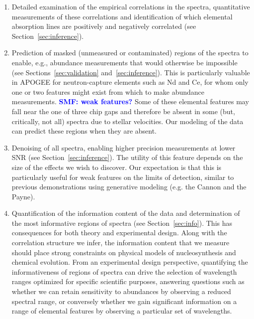 \documentclass[a4paper,fleqn,usenatbib]{mnras}
\newcommand{\smf}[1]{\textbf{\textcolor{blue}{SMF: #1}}}
\begin{document}
\begin{enumerate}
\item Detailed examination of the empirical correlations in the spectra, quantitative measurements of these correlations and identification of which elemental absorption lines are positively and negatively correlated (see Section~\ref{sec:inference}). %
\item Prediction of masked (unmeasured or contaminated) regions of the spectra to enable, e.g., abundance measurements that would otherwise be impossible (see Sections~\ref{sec:validation} and~\ref{sec:inference}). This is particularly valuable in APOGEE for neutron-capture elements such as Nd and Ce, for whom only one or two features might exist from which to make abundance measurements. \smf{weak features?}
Some of these elemental features may fall near the one of three chip gaps and therefore be absent in some (but, critically, not all) spectra due to stellar velocities. Our modeling of the data can predict these regions when they are absent. 
\item Denoising of all spectra, enabling higher precision measurements at lower SNR (see Section~\ref{sec:inference}). The utility of this feature depends on the size of the effects we wish to discover. Our expectation is that this is particularly useful for weak features on the limits of detection, similar to previous demonstrations using generative modeling (e.g. the Cannon and the Payne).
\item Quantification of the information content of the data and determination of the most informative regions of spectra (see Section~\ref{sec:info}). This has consequences for both theory and experimental design. Along with the correlation structure we infer, the information content that we measure should place strong constraints on physical models of nucleosynthesis and chemical evolution. From an experimental design perspective, quantifying the informativeness of regions of spectra can drive the selection of wavelength ranges optimized for specific scientific purposes, answering questions such as whether we can retain sensitivity to abundances by observing a reduced spectral range, or conversely whether we gain significant information on a range of elemental features by observing a particular set of wavelengths.
\end{enumerate}
\end{document}
